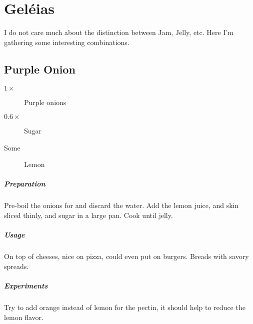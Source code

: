 \setchapterpreamble[u]{\margintoc}
\chapter{Geléias}\label{mocoto}
I do not care much about the distinction between Jam, Jelly, etc. Here I'm gathering some interesting combinations.

\section{Purple Onion}

\begin{multicols}{2}
	\begin{description}
		\item[$1\times$] Purple onions
		\item[$0.6\times$] Sugar
		\item[Some] Lemon
	\end{description}
\end{multicols}	

\paragraph*{Preparation}
Pre-boil the onions for  and discard the water.
%
Add the lemon juice, and skin sliced thinly, and sugar in a large pan. Cook until jelly.

\paragraph*{Usage}
On top of cheeses, nice on pizza, could even put on burgers. Breads with savory spreads.

\paragraph*{Experiments}
Try to add orange instead of lemon for the pectin, it should help to reduce the lemon flavor.
